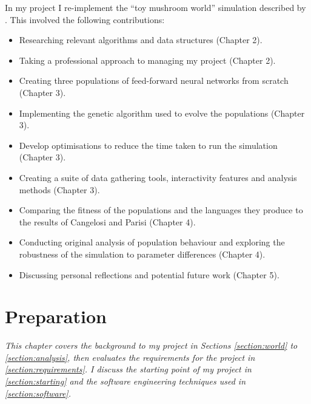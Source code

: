 \documentclass[12pt,a4paper]{report}
\begin{document}
In my project I re-implement the ``toy mushroom world'' simulation described by \citet{Cangelosi1998}. This involved the following contributions:
\begin{itemize}
	\itemsep0em
	\item Researching relevant algorithms and data structures (Chapter 2).
	\item Taking a professional approach to managing my project (Chapter 2).
	\item Creating three populations of feed-forward neural networks from scratch (Chapter 3).
	\item Implementing the genetic algorithm used to evolve the populations (Chapter 3).
	\item Develop optimisations to reduce the time taken to run the simulation (Chapter 3).
	\item Creating a suite of data gathering tools, interactivity features and analysis methods (Chapter 3).
	\item Comparing the fitness of the populations and the languages they produce to the results of Cangelosi and Parisi (Chapter 4).
	\item Conducting original analysis of population behaviour and exploring the robustness of the simulation to parameter differences (Chapter 4).
	\item Discussing personal reflections and potential future work (Chapter 5).
\end{itemize}


\chapter{Preparation}\label{chapter:preparation}

\emph{This chapter covers the background to my project in Sections \ref{section:world} to \ref{section:analysis}, then evaluates the requirements for the project in \cref{section:requirements}. I discuss the starting point of my project in \cref{section:starting} and the software engineering techniques used in \cref{section:software}.}
\end{document}
